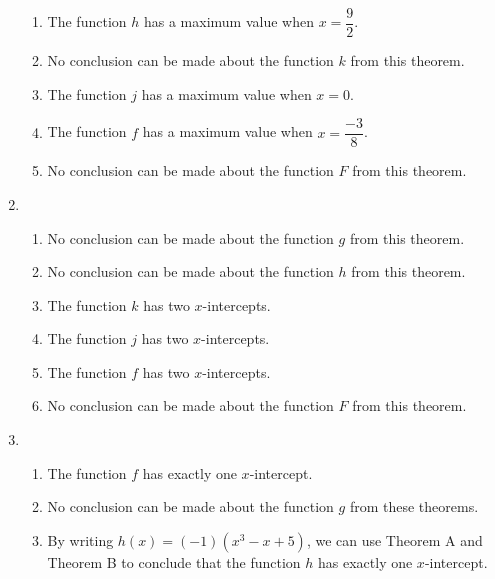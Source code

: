 \begin{enumerate}
\begin{enumerate}
\item The function $h$ has a maximum value when $x = \dfrac{9}{2}$.

\item No conclusion can be made about the function $k$ from this theorem.

\item The function $j$ has a maximum value when $x = 0$.

\item The function $f$ has a maximum value when $x = \dfrac{-3}{8}$.

\item No conclusion can be made about the function $F$ from this theorem.
\end{enumerate}





\item \begin{enumerate}  
\item No conclusion can be made about the function $g$ from this theorem.

\item No conclusion can be made about the function $h$ from this theorem.

\item The function $k$ has two $x$-intercepts.

\item The function $j$ has two $x$-intercepts.

\item The function $f$ has two $x$-intercepts.

\item No conclusion can be made about the function $F$ from this theorem.
\end{enumerate}



\item \begin{enumerate} 
\item The function $f$ has exactly one $x$-intercept.

\item No conclusion can be made about the function $g$ from these theorems.

\item By writing $h(x) = (-1)\left(x^3 - x + 5 \right)$, we can use Theorem A and Theorem B to conclude that the function $h$ has exactly one $x$-intercept.


\end{enumerate}
\end{enumerate}
